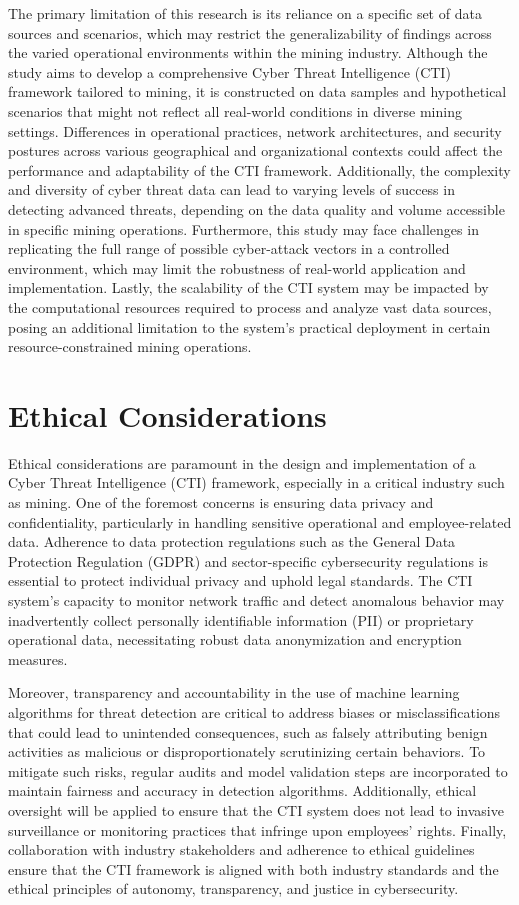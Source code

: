 \documentclass[a4paper,twoside,12pt]{report}
\begin{document}
The primary limitation of this research is its reliance on a specific set of data sources and scenarios, which may restrict the generalizability of findings across the varied operational environments within the mining industry. Although the study aims to develop a comprehensive Cyber Threat Intelligence (CTI) framework tailored to mining, it is constructed on data samples and hypothetical scenarios that might not reflect all real-world conditions in diverse mining settings. Differences in operational practices, network architectures, and security postures across various geographical and organizational contexts could affect the performance and adaptability of the CTI framework. Additionally, the complexity and diversity of cyber threat data can lead to varying levels of success in detecting advanced threats, depending on the data quality and volume accessible in specific mining operations. Furthermore, this study may face challenges in replicating the full range of possible cyber-attack vectors in a controlled environment, which may limit the robustness of real-world application and implementation. Lastly, the scalability of the CTI system may be impacted by the computational resources required to process and analyze vast data sources, posing an additional limitation to the system’s practical deployment in certain resource-constrained mining operations.

\section{Ethical Considerations}

Ethical considerations are paramount in the design and implementation of a Cyber Threat Intelligence (CTI) framework, especially in a critical industry such as mining. One of the foremost concerns is ensuring data privacy and confidentiality, particularly in handling sensitive operational and employee-related data. Adherence to data protection regulations such as the General Data Protection Regulation (GDPR) and sector-specific cybersecurity regulations is essential to protect individual privacy and uphold legal standards. The CTI system’s capacity to monitor network traffic and detect anomalous behavior may inadvertently collect personally identifiable information (PII) or proprietary operational data, necessitating robust data anonymization and encryption measures.

Moreover, transparency and accountability in the use of machine learning algorithms for threat detection are critical to address biases or misclassifications that could lead to unintended consequences, such as falsely attributing benign activities as malicious or disproportionately scrutinizing certain behaviors. To mitigate such risks, regular audits and model validation steps are incorporated to maintain fairness and accuracy in detection algorithms. Additionally, ethical oversight will be applied to ensure that the CTI system does not lead to invasive surveillance or monitoring practices that infringe upon employees’ rights. Finally, collaboration with industry stakeholders and adherence to ethical guidelines ensure that the CTI framework is aligned with both industry standards and the ethical principles of autonomy, transparency, and justice in cybersecurity.
\end{document}
